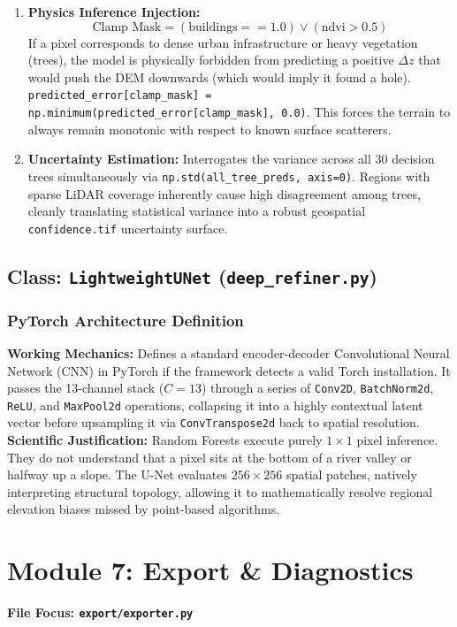 \documentclass[11pt,a4paper,oneside]{report}
\begin{document}
\begin{enumerate}
    \item \textbf{Physics Inference Injection:}
    \begin{equation}
        \text{Clamp Mask} = (\text{buildings} == 1.0) \lor (\text{ndvi} > 0.5)
    \end{equation}
    If a pixel corresponds to dense urban infrastructure or heavy vegetation (trees), the model is physically forbidden from predicting a positive $\Delta z$ that would push the DEM downwards (which would imply it found a hole). \texttt{predicted\_error[clamp\_mask] = np.minimum(predicted\_error[clamp\_mask], 0.0)}. This forces the terrain to always remain monotonic with respect to known surface scatterers.
    \item \textbf{Uncertainty Estimation:} Interrogates the variance across all $30$ decision trees simultaneously via \texttt{np.std(all\_tree\_preds, axis=0)}. Regions with sparse LiDAR coverage inherently cause high disagreement among trees, cleanly translating statistical variance into a robust geospatial \texttt{confidence.tif} uncertainty surface.
\end{enumerate}

\section{Class: \texttt{LightweightUNet} (\texttt{deep\_refiner.py})}
\subsection{PyTorch Architecture Definition}
\textbf{Working Mechanics:} Defines a standard encoder-decoder Convolutional Neural Network (CNN) in PyTorch if the framework detects a valid Torch installation. It passes the 13-channel stack ($C=13$) through a series of \texttt{Conv2D}, \texttt{BatchNorm2d}, \texttt{ReLU}, and \texttt{MaxPool2d} operations, collapsing it into a highly contextual latent vector before upsampling it via \texttt{ConvTranspose2d} back to spatial resolution.
\textbf{Scientific Justification:} Random Forests execute purely $1\times1$ pixel inference. They do not understand that a pixel sits at the bottom of a river valley or halfway up a slope. The U-Net evaluates $256 \times 256$ spatial patches, natively interpreting structural topology, allowing it to mathematically resolve regional elevation biases missed by point-based algorithms.

\chapter{Module 7: Export \& Diagnostics}
\textbf{File Focus: \texttt{export/exporter.py}}
\end{document}
